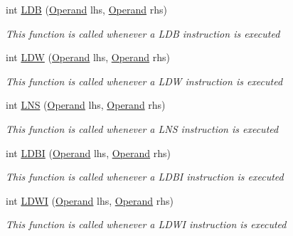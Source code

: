 \begin{DoxyCompactItemize}
int \hyperlink{class_c_p_u___o_s___simulator_1_1_c_p_u_1_1_instruction_ae09705d74d57f968b93ba1739832488f}{L\+D\+B} (\hyperlink{class_c_p_u___o_s___simulator_1_1_c_p_u_1_1_operand}{Operand} lhs, \hyperlink{class_c_p_u___o_s___simulator_1_1_c_p_u_1_1_operand}{Operand} rhs)
\begin{DoxyCompactList}\small\item\em This function is called whenever a L\+D\+B instruction is executed \end{DoxyCompactList}\item 
int \hyperlink{class_c_p_u___o_s___simulator_1_1_c_p_u_1_1_instruction_adc1b564050331c46094af907abb34acb}{L\+D\+W} (\hyperlink{class_c_p_u___o_s___simulator_1_1_c_p_u_1_1_operand}{Operand} lhs, \hyperlink{class_c_p_u___o_s___simulator_1_1_c_p_u_1_1_operand}{Operand} rhs)
\begin{DoxyCompactList}\small\item\em This function is called whenever a L\+D\+W instruction is executed \end{DoxyCompactList}\item 
int \hyperlink{class_c_p_u___o_s___simulator_1_1_c_p_u_1_1_instruction_abaa66d00b38349cd8033c8c1428a9ca3}{L\+N\+S} (\hyperlink{class_c_p_u___o_s___simulator_1_1_c_p_u_1_1_operand}{Operand} lhs, \hyperlink{class_c_p_u___o_s___simulator_1_1_c_p_u_1_1_operand}{Operand} rhs)
\begin{DoxyCompactList}\small\item\em This function is called whenever a L\+N\+S instruction is executed \end{DoxyCompactList}\item 
int \hyperlink{class_c_p_u___o_s___simulator_1_1_c_p_u_1_1_instruction_a41d94be59f02b4ff381bed811f0c4f2e}{L\+D\+B\+I} (\hyperlink{class_c_p_u___o_s___simulator_1_1_c_p_u_1_1_operand}{Operand} lhs, \hyperlink{class_c_p_u___o_s___simulator_1_1_c_p_u_1_1_operand}{Operand} rhs)
\begin{DoxyCompactList}\small\item\em This function is called whenever a L\+D\+B\+I instruction is executed \end{DoxyCompactList}\item 
int \hyperlink{class_c_p_u___o_s___simulator_1_1_c_p_u_1_1_instruction_a2a8c6cf1d6f14e9d219fabc5957cd586}{L\+D\+W\+I} (\hyperlink{class_c_p_u___o_s___simulator_1_1_c_p_u_1_1_operand}{Operand} lhs, \hyperlink{class_c_p_u___o_s___simulator_1_1_c_p_u_1_1_operand}{Operand} rhs)
\begin{DoxyCompactList}\small\item\em This function is called whenever a L\+D\+W\+I instruction is executed \end{DoxyCompactList}\item 

\end{DoxyCompactItemize}
